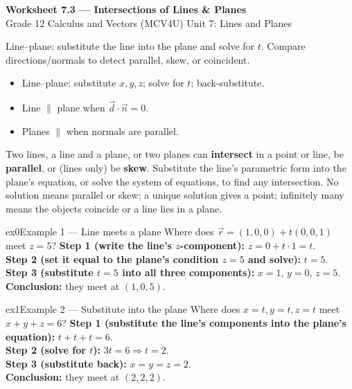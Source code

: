 \documentclass[11pt]{article}
\begin{document}
\begin{center}
{\LARGE\bfseries\color{titleblue}Worksheet 7.3 --- Intersections of Lines \& Planes}\\[2pt]
{\small Grade 12 Calculus and Vectors (MCV4U) \textperiodcentered{} Unit 7: Lines and Planes}
\end{center}

\begin{ideabox}
Line–plane: substitute the line into the plane and solve for $t$. Compare directions/normals to detect parallel, skew, or coincident.
\begin{itemize}[leftmargin=*,itemsep=2pt]
  \item Line–plane: substitute $x,y,z$; solve for $t$; back-substitute.
  \item Line $\parallel$ plane when $\vec d\cdot\vec n=0$.
  \item Planes $\parallel$ when normals are parallel.
\end{itemize}
\end{ideabox}

\begin{learnbox}
Two lines, a line and a plane, or two planes can \textbf{intersect} in a point or line, be \textbf{parallel}, or (lines only) be \textbf{skew}.
Substitute the line's parametric form into the plane's equation, or solve the system of equations, to find any intersection.
No solution means parallel or skew; a unique solution gives a point; infinitely many means the objects coincide or a line lies in a plane.
\end{learnbox}


\begin{example}{ex0}{Example 1 --- Line meets a plane}
Where does $\vec r=(1,0,0)+t(0,0,1)$ meet $z=5$?\soln
\textbf{Step 1 (write the line's $z$-component):} $z=0+t\cdot1=t$.\\[3pt]
\textbf{Step 2 (set it equal to the plane's condition $z=5$ and solve):} $t=5$.\\[3pt]
\textbf{Step 3 (substitute $t=5$ into all three components):} $x=1$, $y=0$, $z=5$.\\[3pt]
\textbf{Conclusion:} they meet at $(1,0,5)$.
\end{example}

\begin{example}{ex1}{Example 2 --- Substitute into the plane}
Where does $x=t,y=t,z=t$ meet $x+y+z=6$?\soln
\textbf{Step 1 (substitute the line's components into the plane's equation):} $t+t+t=6$.\\[3pt]
\textbf{Step 2 (solve for $t$):} $3t=6\Rightarrow t=2$.\\[3pt]
\textbf{Step 3 (substitute back):} $x=y=z=2$.\\[3pt]
\textbf{Conclusion:} they meet at $(2,2,2)$.
\end{example}
\end{document}
